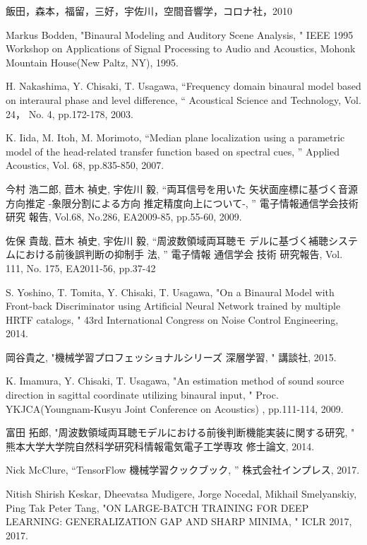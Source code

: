 ﻿	%
\begin{thebibliography}{99}
飯田，森本，福留，三好，宇佐川，空間音響学，コロナ社，2010 

Markus Bodden, "Binaural Modeling and Auditory Scene Analysis, "
IEEE 1995 Workshop on Applications of Signal Processing to Audio and Acoustics, 
Mohonk Mountain House(New Paltz, NY), 1995.

H. Nakashima, Y. Chisaki, T. Usagawa, “Frequency domain
binaural model based on interaural phase and level
difference, “ Acoustical Science and Technology, Vol. 24，
No. 4, pp.172-178, 2003.

K. Iida, M. Itoh, M. Morimoto, “Median plane localization
using a parametric model of the head-related transfer
function based on spectral cues, ” Applied Acoustics, Vol. 
68, pp.835-850, 2007.

今村 浩二郎, 苣木 禎史, 宇佐川 毅, “両耳信号を用いた
矢状面座標に基づく音源方向推定 -象限分割による方向
推定精度向上について-, ” 電子情報通信学会技術研究
報告, Vol.68, No.286, EA2009-85, pp.55-60, 2009.

佐保 貴哉, 苣木 禎史, 宇佐川 毅, “周波数領域両耳聴モ
デルに基づく補聴システムにおける前後誤判断の抑制手
法, ” 電子情報 通信学会 技術 研究報告, Vol. 111, No. 
175, EA2011-56, pp.37-42

S. Yoshino, T. Tomita, Y. Chisaki, T. Usagawa, "On a Binaural Model with 
Front-back Discriminator using Artificial Neural Network trained by multiple
 HRTF catalogs, " 43rd International Congress on Noise Control Engineering, 2014.

岡谷貴之, "機械学習プロフェッショナルシリーズ 深層学習, " 
講談社, 2015.

K. Imamura, Y. Chisaki, T. Usagawa, "An estimation method
of sound source direction in sagittal coordinate utilizing
binaural input, " Proc. YKJCA(Youngnam-Kusyu Joint Conference on Acoustics)
, pp.111-114, 2009.

富田 拓郎, "周波数領域両耳聴モデルにおける前後判断機能実装に関する研究, "
熊本大学大学院自然科学研究科情報電気電子工学専攻 修士論文, 2014.

Nick McClure, “TensorFlow 機械学習クックブック, ” 
株式会社インプレス, 2017.

Nitish Shirish Keskar, Dheevatsa Mudigere, Jorge Nocedal, Mikhail Smelyanskiy, Ping Tak Peter Tang, 
"ON LARGE-BATCH TRAINING FOR DEEP LEARNING: GENERALIZATION GAP AND SHARP MINIMA, "
ICLR 2017, 2017.


\end{thebibliography}
